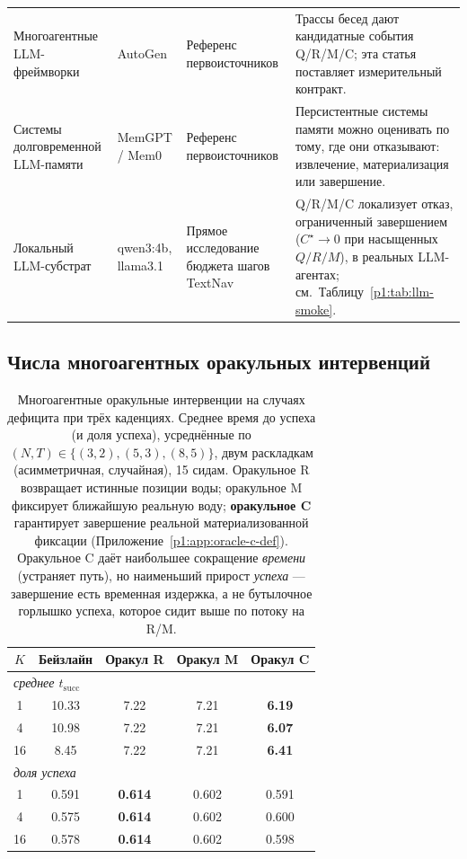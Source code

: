 \documentclass{article}
\begin{document}
\begin{table}[h]
\begin{tabular}{p{2.45cm}p{2.55cm}p{2.7cm}p{4.0cm}}
Многоагентные LLM-фреймворки & AutoGen \citep{wu2023autogen} & Референс первоисточников & Трассы бесед дают кандидатные события Q/R/M/C; эта статья поставляет измерительный контракт. \\
Системы долговременной LLM-памяти & MemGPT / Mem0 \citep{packer2023memgpt,chhikara2025mem0} & Референс первоисточников & Персистентные системы памяти можно оценивать по тому, где они отказывают: извлечение, материализация или завершение. \\
Локальный LLM-субстрат & qwen3:4b, llama3.1 & Прямое исследование бюджета шагов TextNav & Q/R/M/C локализует отказ, ограниченный завершением ($C^\star{\to}0$ при насыщенных $Q/R/M$), в реальных LLM-агентах; см.\ Таблицу~\ref{p1:tab:llm-smoke}. \\
\bottomrule
\end{tabular}
\end{table}

\subsection{Числа многоагентных оракульных интервенций}
\label{p1:app:multi-oracle}

\begin{table}[h]
\caption{Многоагентные оракульные интервенции на случаях дефицита при трёх каденциях. Среднее время до успеха (и доля успеха), усреднённые по $(N,T)\in\{(3,2),(5,3),(8,5)\}$, двум раскладкам (асимметричная, случайная), 15 сидам. Оракульное R возвращает истинные позиции воды; оракульное M фиксирует ближайшую реальную воду; \textbf{оракульное C} гарантирует завершение реальной материализованной фиксации (Приложение~\ref{p1:app:oracle-c-def}). Оракульное C даёт наибольшее сокращение \emph{времени} (устраняет путь), но наименьший прирост \emph{успеха} --- завершение есть временная издержка, а не бутылочное горлышко успеха, которое сидит выше по потоку на R/M.}
\label{p1:tab:multi-agent-oracle}
\centering
\small
\begin{tabular}{c c c c c}
\toprule
$K$ & Бейзлайн & Оракул R & Оракул M & Оракул C \\
\midrule
\multicolumn{5}{l}{\emph{среднее $t_{\mathrm{succ}}$}}\\
1  & 10.33 & 7.22 & 7.21 & \textbf{6.19} \\
4  & 10.98 & 7.22 & 7.21 & \textbf{6.07} \\
16 &  8.45 & 7.22 & 7.21 & \textbf{6.41} \\
\midrule
\multicolumn{5}{l}{\emph{доля успеха}}\\
1  & 0.591 & \textbf{0.614} & 0.602 & 0.591 \\
4  & 0.575 & \textbf{0.614} & 0.602 & 0.600 \\
16 & 0.578 & \textbf{0.614} & 0.602 & 0.598 \\
\bottomrule
\end{tabular}
\end{table}
\end{document}

